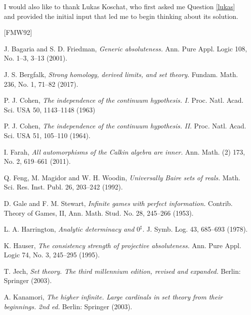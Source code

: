 \documentclass[10pt]{amsart}
\theoremstyle{definition}
\begin{document}
I would also like to thank Lukas Koschat, who first asked me Question \ref{lukas} and provided the initial input that led me to begin thinking about its solution.


\begin{thebibliography}{[FMW92]}

 J. Bagaria and S. D. Friedman,
\emph{Generic absoluteness.}
Ann. Pure Appl. Logic 108, No. 1--3, 3--13 (2001).

 J. S. Bergfalk,
\emph{Strong homology, derived limits, and set theory.}
Fundam. Math. 236, No. 1, 71--82 (2017).


 P. J. Cohen,
\emph{The independence of the continuum hypothesis. I.}
Proc. Natl. Acad. Sci. USA 50, 1143--1148 (1963)

 P. J. Cohen,
\emph{The independence of the continuum hypothesis. II.}
Proc. Natl. Acad. Sci. USA 51, 105--110 (1964).


 I. Farah,
\emph{All automorphisms of the Calkin algebra are inner.}
Ann. Math. (2) 173, No. 2, 619--661 (2011).

 Q. Feng, M. Magidor and W. H. Woodin,
\emph{Universally Baire sets of reals.}
Math. Sci. Res. Inst. Publ. 26, 203--242 (1992).

 D. Gale and F. M. Stewart,
\emph{Infinite games with perfect information.}
Contrib. Theory of Games, II, Ann. Math. Stud. No. 28, 245--266 (1953).

 L. A. Harrington,
\emph{Analytic determinacy and $0^\sharp$.}
J. Symb. Log. 43, 685--693 (1978).

 K. Hauser,
\emph{The consistency strength of projective absoluteness.}
Ann. Pure Appl. Logic 74, No. 3, 245--295 (1995).

 T. Jech,
\emph{Set theory. The third millennium edition, revised and expanded.}
Berlin: Springer (2003).

  A. Kanamori,
\emph{The higher infinite. Large cardinals in set theory from their beginnings. 2nd ed.}
Berlin: Springer (2003).


\end{thebibliography}
\end{document}
